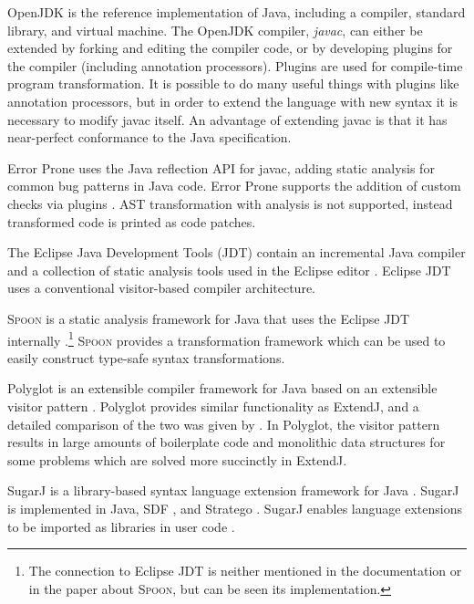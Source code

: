 \documentclass[10pt, twoside, openright]{book}
\begin{document}
\vspace{1em}

OpenJDK is the reference implementation of Java, including a compiler, standard library,
and virtual machine.
The OpenJDK compiler, \emph{javac}, can either be extended by forking and editing the compiler
code, or by developing plugins for the compiler (including annotation processors).
Plugins are used for compile-time program transformation.
It is possible to do many useful things with plugins like annotation processors,
but in order to extend the language with new syntax it is
necessary to modify javac itself.
An advantage of extending javac is that
it has near-perfect conformance to the Java specification.

Error Prone uses the Java reflection API for javac, adding static analysis for common bug patterns
in Java code.  Error Prone supports the addition of custom checks via plugins
\cite{DBLP:conf/scam/AftandilianSPK12}. AST transformation with analysis is not supported,
instead transformed code is printed as code patches.

The Eclipse Java Development Tools (JDT) contain an incremental Java compiler and
a collection of static analysis tools used in the Eclipse editor \cite{eclipsejdt}.
Eclipse JDT uses a conventional visitor-based compiler architecture.

\textsc{Spoon} is a static analysis framework for Java that uses the Eclipse
JDT internally \cite{DBLP:journals/spe/PawlakMPNS16}.\footnote{%
The connection to Eclipse JDT is neither
mentioned in the documentation or in the paper about \textsc{Spoon}, but can be seen its implementation.}
\textsc{Spoon} provides a transformation framework which can be used to easily construct
type-safe syntax transformations.

Polyglot is an extensible compiler framework for Java based on an extensible visitor pattern
\cite{DBLP:conf/cc/NystromCM03}. Polyglot provides similar functionality as ExtendJ, and
a detailed comparison of the two was given by \cite{DBLP:conf/aosd/AvgustinovET08}.
In Polyglot, the visitor pattern results in large amounts of boilerplate code and monolithic
data structures for some problems which are solved more succinctly in ExtendJ.

SugarJ is a library-based syntax language extension framework for Java \cite{DBLP:conf/oopsla/ErdwegRKO11}.
SugarJ is implemented
in Java,
SDF \cite{DBLP:journals/sigplan/HeeringHKR89},
and Stratego \cite{DBLP:conf/rta/Visser01}.
SugarJ enables language extensions to be imported as libraries in user code
\cite{DBLP:conf/oopsla/ErdwegRKO11}.
\end{document}
